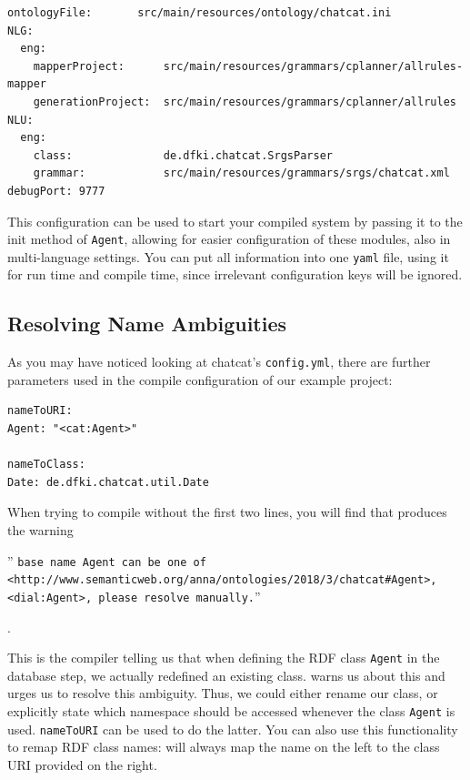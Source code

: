 \begin{verbatim}
ontologyFile:       src/main/resources/ontology/chatcat.ini
NLG:
  eng:
    mapperProject:      src/main/resources/grammars/cplanner/allrules-mapper
    generationProject:  src/main/resources/grammars/cplanner/allrules
NLU:
  eng:
    class:              de.dfki.chatcat.SrgsParser
    grammar:            src/main/resources/grammars/srgs/chatcat.xml
debugPort: 9777
\end{verbatim}

This configuration can be used to start your compiled system by passing it to
the init method of \texttt{Agent}, allowing for easier configuration of these
modules, also in multi-language settings. You can put all information into one
\texttt{yaml} file, using it for run time and compile time, since irrelevant
configuration keys will be ignored.

\subsection{Resolving Name Ambiguities} \label{sec:nsAmbigue}

As you may have noticed looking at chatcat's \texttt{config.yml}, there are
further parameters used in the compile configuration of our example project:

\begin{verbatim}
nameToURI:
Agent: "<cat:Agent>"

nameToClass:
Date: de.dfki.chatcat.util.Date
\end{verbatim}

When trying to compile without the first two lines, you will find that \vonda
produces the warning \begin{small}'' \texttt{base name Agent can be one of
    <http://www.semanticweb.org/anna/ontologies/2018/3/chatcat\#Agent>,
    <dial:Agent>, please resolve manually.}''
\end{small}.

This is the compiler telling us that when defining the RDF class \texttt{Agent}
in the database step, we actually redefined an existing class. \vonda warns us
about this and urges us to resolve this ambiguity. Thus, we could either rename
our class, or explicitly state which namespace should be accessed whenever the
class \texttt{Agent} is used. \texttt{nameToURI} can be used to do the latter.
You can also use this functionality to remap RDF class names: \vonda will
always map the name on the left to the class URI provided on the right.

